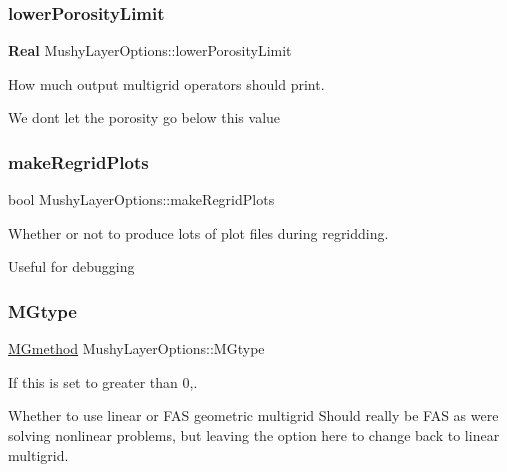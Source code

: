 \subsubsection{\texorpdfstring{lower\+Porosity\+Limit}{lowerPorosityLimit}}
{\footnotesize\ttfamily \textbf{ Real} Mushy\+Layer\+Options\+::lower\+Porosity\+Limit}



How much output multigrid operators should print. 

We don\textquotesingle{}t let the porosity go below this value \mbox{\label{struct_mushy_layer_options_aa149c736981aa04179325ffcef87bdba}} 
\subsubsection{\texorpdfstring{make\+Regrid\+Plots}{makeRegridPlots}}
{\footnotesize\ttfamily bool Mushy\+Layer\+Options\+::make\+Regrid\+Plots}



Whether or not to produce lots of plot files during regridding. 

Useful for debugging \mbox{\label{struct_mushy_layer_options_a95b4866ff6bd6d9ba166a65cf0451873}} 
\subsubsection{\texorpdfstring{M\+Gtype}{MGtype}}
{\footnotesize\ttfamily \hyperlink{mushy_layer_opt_8h_a1f6390801f119adac644ec2f1b17079c}{M\+Gmethod} Mushy\+Layer\+Options\+::\+M\+Gtype}



If this is set to greater than 0,. 

Whether to use linear or F\+AS geometric multigrid Should really be F\+AS as we\textquotesingle{}re solving nonlinear problems, but leaving the option here to change back to linear multigrid. \mbox{\label{struct_mushy_layer_options_a5e66ad315df2dbff60ee56ea25ed68ae}} 
